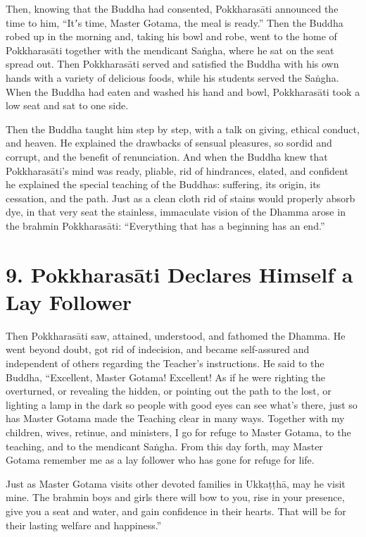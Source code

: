 \documentclass[12pt,openany]{book}%
\begin{document}
Then, knowing that the Buddha had consented, \textsanskrit{Pokkharasāti} announced the time to him, “Itʼs time, Master Gotama, the meal is ready.” Then the Buddha robed up in the morning and, taking his bowl and robe, went to the home of \textsanskrit{Pokkharasāti} together with the mendicant \textsanskrit{Saṅgha}, where he sat on the seat spread out. Then \textsanskrit{Pokkharasāti} served and satisfied the Buddha with his own hands with a variety of delicious foods, while his students served the \textsanskrit{Saṅgha}. When the Buddha had eaten and washed his hand and bowl, \textsanskrit{Pokkharasāti} took a low seat and sat to one side. 

Then the Buddha taught him step by step, with a talk on giving, ethical conduct, and heaven. He explained the drawbacks of sensual pleasures, so sordid and corrupt, and the benefit of renunciation. And when the Buddha knew that \textsanskrit{Pokkharasāti}’s mind was ready, pliable, rid of hindrances, elated, and confident he explained the special teaching of the Buddhas: suffering, its origin, its cessation, and the path. Just as a clean cloth rid of stains would properly absorb dye, in that very seat the stainless, immaculate vision of the Dhamma arose in the brahmin \textsanskrit{Pokkharasāti}: “Everything that has a beginning has an end.” 

\section*{9. \textsanskrit{Pokkharasāti} Declares Himself a Lay Follower }

Then \textsanskrit{Pokkharasāti} saw, attained, understood, and fathomed the Dhamma. He went beyond doubt, got rid of indecision, and became self-assured and independent of others regarding the Teacher’s instructions. He said to the Buddha, “Excellent, Master Gotama! Excellent! As if he were righting the overturned, or revealing the hidden, or pointing out the path to the lost, or lighting a lamp in the dark so people with good eyes can see what’s there, just so has Master Gotama made the Teaching clear in many ways. Together with my children, wives, retinue, and ministers, I go for refuge to Master Gotama, to the teaching, and to the mendicant \textsanskrit{Saṅgha}. From this day forth, may Master Gotama remember me as a lay follower who has gone for refuge for life. 

Just as Master Gotama visits other devoted families in \textsanskrit{Ukkaṭṭhā}, may he visit mine. The brahmin boys and girls there will bow to you, rise in your presence, give you a seat and water, and gain confidence in their hearts. That will be for their lasting welfare and happiness.” 
\end{document}
